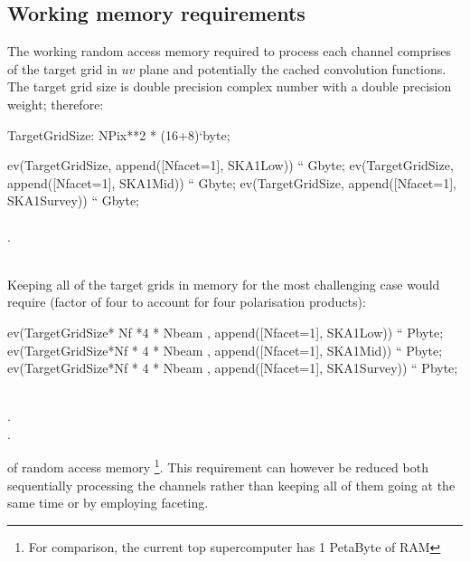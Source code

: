 \documentclass[useAMS,usenatbib,referee]{article}
\begin{document}
\subsection{Working memory requirements}

The working random access memory required to process each channel
comprises of the target grid in $uv$ plane and potentially the cached
convolution functions. The target grid size is double precision
complex number with a double precision weight; therefore:

\begin{maxima}[]
TargetGridSize: NPix**2 * (16+8)`byte;

ev(TargetGridSize, append([Nfacet=1], SKA1Low)) `` Gbyte;
ev(TargetGridSize, append([Nfacet=1], SKA1Mid)) `` Gbyte;
ev(TargetGridSize, append([Nfacet=1], SKA1Survey)) `` Gbyte;
\maximaoutput*
{}\; \\
\; \\
.\; \\
\; \\
\end{maxima}

Keeping all of the target grids in memory for the most challenging
case would require (factor of four to account for four polarisation
products):
\begin{maxima}[]
ev(TargetGridSize* Nf *4 * Nbeam  , append([Nfacet=1], SKA1Low)) `` Pbyte;
ev(TargetGridSize*Nf * 4 * Nbeam , append([Nfacet=1], SKA1Mid)) `` Pbyte;
ev(TargetGridSize*Nf * 4 * Nbeam , append([Nfacet=1], SKA1Survey)) `` Pbyte;

\maximaoutput*
{}\; \\
.\; \\
.\; \\
\end{maxima}
of random access memory \footnote{For comparison, the current top supercomputer has 1
  PetaByte of RAM}. This requirement can however be reduced both
sequentially processing the channels rather than keeping all of them
going at the same time or by employing faceting.
\end{document}
